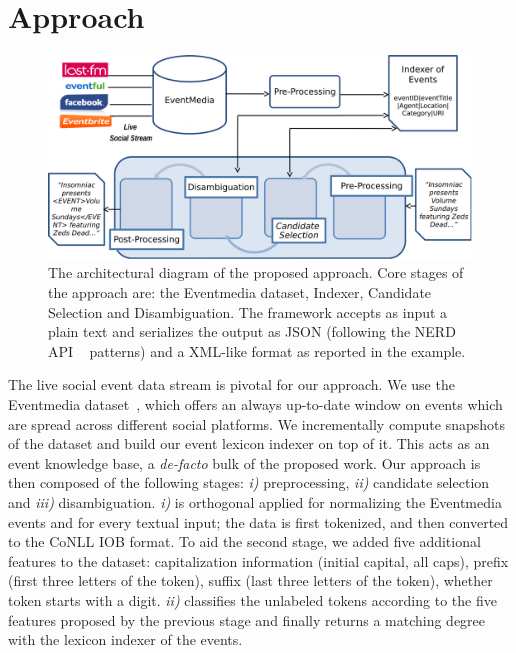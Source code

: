 \documentclass[10pt,a4paper]{article}
\begin{document}
\section{Approach}
\begin{figure}
\includegraphics[width=\textwidth]{architecture.pdf}
\caption{The architectural diagram of the proposed approach. Core stages of the approach are: the Eventmedia dataset, Indexer, Candidate Selection and Disambiguation. The framework accepts as input a plain text and serializes the output as JSON (following the NERD API ~\cite{RIZZO:2012} patterns) and a XML-like format as reported in the example.}
\label{fig:architecture}
\end{figure}
The live social event data stream is pivotal for our approach. We use the Eventmedia dataset~\cite{krouf2012}, which offers an always up-to-date window on events which are spread across different social platforms. We incrementally compute snapshots of the dataset and build our event lexicon indexer on top of it. This acts as an event knowledge base, a \textit{de-facto} bulk of the proposed work. Our approach is then composed of the following stages: \textit{i)} preprocessing, \textit{ii)} candidate selection and \textit{iii)} disambiguation. \textit{i)} is orthogonal applied for normalizing the Eventmedia events and for every textual input; the data is first tokenized, and then converted to the CoNLL IOB format. To aid the second stage, we added five additional features to the dataset: capitalization information (initial capital, all caps), prefix (first three letters of the token), suffix (last three letters of the token), whether token starts with a digit.
\textit{ii)} classifies the unlabeled tokens according to the five features proposed by the previous stage and finally returns a matching degree with the lexicon indexer of the events. 
\end{document}
